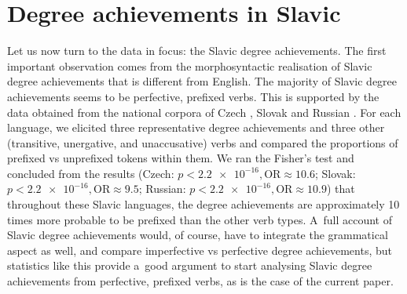 \documentclass[output=paper]{langscibook}
\begin{document}
\section{Degree achievements in Slavic\label{DA:sec:Slavic degree achievements}}

Let us now turn to the data in focus: the Slavic degree achievements. The first important observation comes from the morphosyntactic realisation of Slavic degree achievements that is different from English. The majority of Slavic degree achievements seems to be perfective, prefixed verbs. This is supported by the data obtained from the national corpora of Czech \citep{korpus}, Slovak \citep{korpusSK} and Russian \citep{korpusRU}. For each language, we elicited three representative degree achievements and three other (transitive, unergative, and unaccusative) verbs and compared the proportions of prefixed vs unprefixed tokens within them. We ran the Fisher's test and concluded from the results (Czech: $p < \num{2.2e-16},\allowbreak \text{OR} \approx 10.6$; Slovak: $p < \num{2.2e-16},\allowbreak \text{OR} \approx 9.5$; Russian: $p < \num{2.2e-16},\allowbreak \text{OR} \approx 10.9$) that throughout these Slavic languages, the degree achievements are approximately 10 times more probable to be prefixed than the other verb types. A~full account of Slavic degree achievements would, of course, have to integrate the grammatical aspect as well, and compare imperfective vs perfective degree achievements, but statistics like this provide a~good argument to start analysing Slavic degree achievements from perfective, prefixed verbs, as is the case of the current paper.
\end{document}
